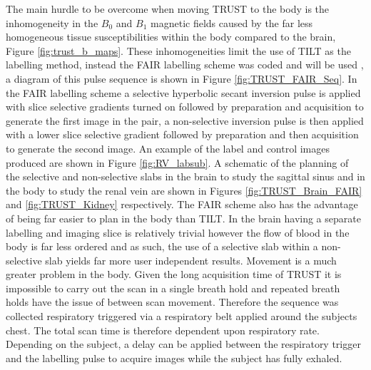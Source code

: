 The main hurdle to be overcome when moving \ac{TRUST} to the body is the inhomogeneity in the $B_0$ and $B_1$ magnetic fields caused by the far less homogeneous tissue susceptibilities within the body compared to the brain, Figure \ref{fig:trust_b_maps}. These inhomogeneities limit the use of \ac{TILT} as the labelling method, instead the \ac{FAIR} labelling scheme was coded and will be used \cite{martirosian_fair_2004}, a diagram of this pulse sequence is shown in Figure \ref{fig:TRUST_FAIR_Seq}. In the \ac{FAIR} labelling scheme a selective hyperbolic secant inversion pulse is applied with slice selective gradients turned on followed by \ttwo preparation and acquisition to generate the first image in the pair, a non-selective inversion pulse is then applied with a lower slice selective gradient followed by \ttwo preparation and then acquisition to generate the second image. An example of the label and control images produced are shown in Figure \ref{fig:RV_labsub}. A schematic of the planning of the selective and non-selective slabs in the brain to study the sagittal sinus and in the body to study the renal vein are shown in Figures \ref{fig:TRUST_Brain_FAIR} and \ref{fig:TRUST_Kidney} respectively. The \ac{FAIR} scheme also has the advantage of being far easier to plan in the body than \ac{TILT}. In the brain having a separate labelling and imaging slice is relatively trivial however the flow of blood in the body is far less ordered and as such, the use of a selective slab within a non-selective slab yields far more user independent results. Movement is a much greater problem in the body. Given the long acquisition time of \ac{TRUST} it is impossible to carry out the scan in a single breath hold and repeated breath holds have the issue of between scan movement. Therefore the sequence was collected respiratory triggered via a respiratory belt applied around the subjects chest. The total scan time is therefore dependent upon respiratory rate. Depending on the subject, a delay can be applied between the respiratory trigger and the labelling pulse to acquire images while the subject has fully exhaled.

